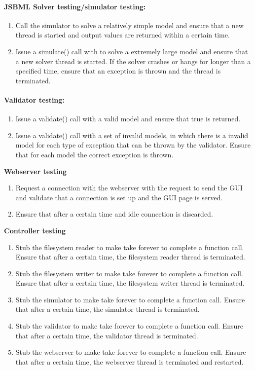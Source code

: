 \paragraph{JSBML Solver testing/simulator testing:}
\begin{enumerate}
\item 
Call the simulator  to solve a relatively simple model and ensure that a new thread is started and output values are returned within a certain time.
\item Issue a simulate() call with  to solve a extremely large model and ensure that a new solver thread is started. If the solver crashes or hangs for longer than a specified time, ensure that an exception is thrown and the thread is terminated.
\end{enumerate}

\paragraph{Validator testing:}

\begin{enumerate}
\item Issue a validate() call with a valid model and ensure that true is returned.
\item Issue a validate() call with a set of invalid models, in which there is a invalid model for each type of exception that can be thrown by the validator. Ensure that for each model the correct exception is thrown. 
\end{enumerate}
\textbf{Webserver testing}
\begin{enumerate}
\item Request a connection with the webserver with the request to send the GUI and validate that a connection is set up and the GUI page is  served. 
\item Ensure that after a certain time and idle connection is discarded.
\end{enumerate}
\textbf{Controller testing}
\begin{enumerate}
\item Stub the filesystem reader to make take forever to complete a function call. Ensure that after a certain time, the filesystem reader thread is terminated.
\item Stub the filesystem writer to make take forever to complete a function call. Ensure that after a certain time, the filesystem writer thread is terminated.

\item Stub the simulator to make take forever to complete a function call. Ensure that after a certain time, the  simulator thread is terminated.

\item Stub the validator to make take forever to complete a function call. Ensure that after a certain time, the  validator thread is terminated.

\item Stub the webserver to make take forever to complete a function call. Ensure that after a certain time, the  webserver thread is terminated and restarted.\end{enumerate}

